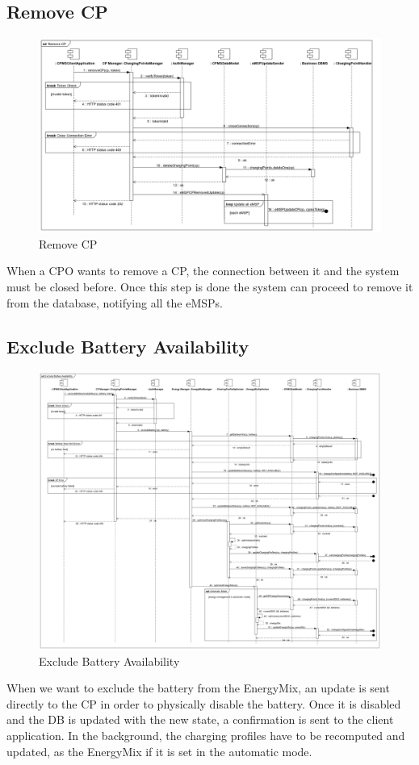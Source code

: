 \documentclass{Configuration_Files/PoliMi3i_thesis}
\begin{document}
\subsection{Remove CP}

\begin{figure}[H]
    \centering
    \includegraphics[width=1\textwidth]{Images/sequenceDiagrams/Remove CP.jpg}
    \caption{Remove CP}
\end{figure}
When a CPO wants to remove a CP, the connection between it and the system must be closed before. Once this step is done the system can proceed to remove it from the database, notifying all the eMSPs.

\subsection{Exclude Battery Availability}
\begin{figure}[H]
    \centering
    \includegraphics[width=1\textwidth]{Images/sequenceDiagrams/Exclude Battery Availability.jpg}
    \caption{Exclude Battery Availability}
\end{figure}
When we want to exclude the battery from the EnergyMix, an update is sent directly to the CP in order to physically disable the battery. Once it is disabled and the DB is updated with the new state, a confirmation is sent to the client application. In the background, the charging profiles have to be recomputed and updated, as the EnergyMix if it is set in the automatic mode.
\end{document}

